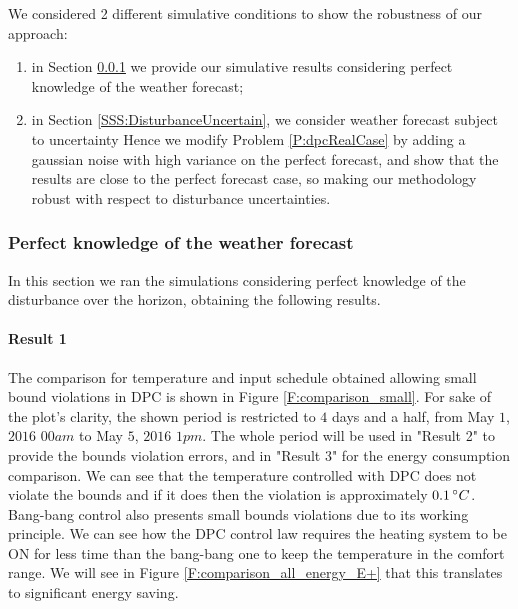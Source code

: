 \textcolor[rgb]{0,0,1}{We considered 2 different simulative conditions to show the robustness of our approach:
\begin{enumerate}
	\item in Section \ref{SSS:DisturbancePerfect} we provide our simulative results considering perfect knowledge of the weather forecast;
	\item in Section \ref{SSS:DisturbanceUncertain}, we consider weather forecast subject to uncertainty Hence we modify Problem \ref{P:dpcRealCase} by adding a gaussian noise with high variance on the perfect forecast, and show that the results are close to the perfect forecast case, so making our methodology robust with respect to disturbance uncertainties.
\end{enumerate}
\subsubsection{Perfect knowledge of the weather forecast}\label{SSS:DisturbancePerfect}
In this section we ran the simulations considering perfect knowledge of the disturbance over the horizon, obtaining the following results.}
\paragraph{Result 1} The comparison for temperature and input schedule obtained allowing small bound violations in DPC is shown in Figure \ref{F:comparison_small}. For sake of the plot's clarity, the shown period is restricted to $4$ days and a half, from May $1$, $2016$ $00am$ to May $5$, $2016$ $1pm$. \textcolor[rgb]{0,0,1}{The whole period will be used in "Result 2" to provide the bounds violation errors, and in "Result 3" for the energy consumption comparison.}
We can see that the temperature controlled with DPC does not violate the bounds and if it does then the violation is approximately $0.1\,\degree C$. Bang-bang control also presents small bounds violations due to its working principle. We can see how the DPC control law requires the heating system to be ON for less time than the bang-bang one to keep the temperature in the comfort range. 
We will see in Figure \ref{F:comparison_all_energy_E+} that this translates to significant energy saving.

